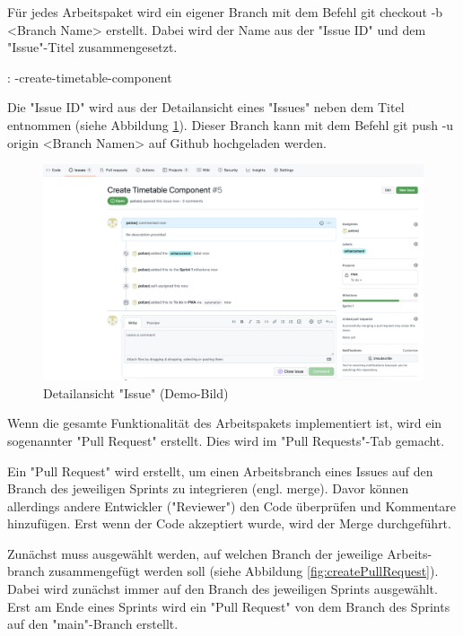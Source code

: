
Für jedes Arbeitspaket wird ein eigener Branch mit dem Befehl {\ttfamily git checkout -b <Branch Name>} erstellt. Dabei wird der Name aus der "Issue ID" und dem "Issue"-Titel zusammengesetzt. 

\zb:
{-create-timetable-component}

Die "Issue ID" wird aus der Detailansicht eines "Issues" neben dem Titel entnommen (siehe Abbildung \ref{fig:issueInfo}). Dieser Branch kann mit dem Befehl {\ttfamily git push -u origin <Branch Namen>} auf Github hochgeladen werden. 

\begin{figure}[H]
    \centering
    \includegraphics[width=\textwidth]{media/ProjectManagement/IssueInfo.png}
    \caption{Detailansicht "Issue" (Demo-Bild)}
    \label{fig:issueInfo}
\end{figure}


Wenn die gesamte Funktionalität des Arbeitspakets implementiert ist, wird ein sogenannter "Pull Request" erstellt. Dies wird im "Pull Requests"-Tab gemacht. 

Ein "Pull Request" wird erstellt, um einen Arbeitsbranch eines Issues auf den Branch des jeweiligen Sprints zu integrieren (engl. merge). Davor können allerdings andere Entwickler ("Reviewer") den Code überprüfen und Kommentare hinzufügen. Erst wenn der Code akzeptiert wurde, wird der Merge durchgeführt.

Zunächst muss ausgewählt werden, auf welchen Branch der jeweilige Arbeits-branch zusammengefügt werden soll (siehe Abbildung \ref{fig:createPullRequest}). Dabei wird zunächst immer auf den Branch des jeweiligen Sprints ausgewählt. Erst am Ende eines Sprints wird ein "Pull Request" von dem Branch des Sprints auf den "main"-Branch erstellt.

